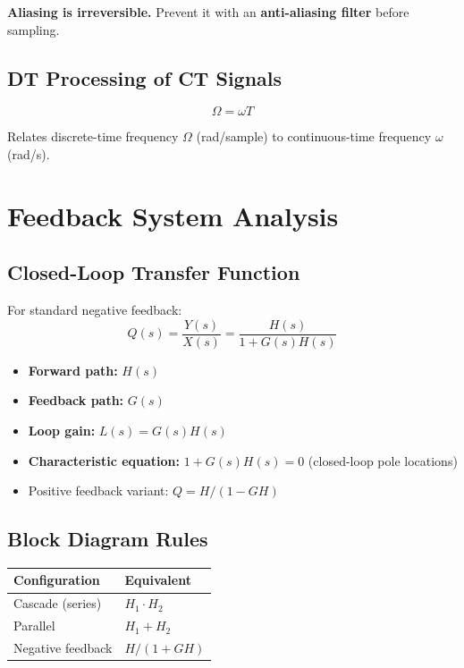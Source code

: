 \documentclass{article}
\begin{document}
\textbf{Aliasing is irreversible.} Prevent it with an \textbf{anti-aliasing filter} before sampling.

\subsection{DT Processing of CT Signals}

$$\Omega = \omega T$$

Relates discrete-time frequency $\Omega$ (rad/sample) to continuous-time frequency $\omega$ (rad/s).

\section{Feedback System Analysis}

\subsection{Closed-Loop Transfer Function}

For standard negative feedback:
$$Q(s) = \frac{Y(s)}{X(s)} = \frac{H(s)}{1 + G(s)H(s)}$$

\begin{itemize}
  \item \textbf{Forward path:} $H(s)$
  \item \textbf{Feedback path:} $G(s)$
  \item \textbf{Loop gain:} $L(s) = G(s)H(s)$
  \item \textbf{Characteristic equation:} $1 + G(s)H(s) = 0$ (closed-loop pole locations)
  \item Positive feedback variant: $Q = H/(1 - GH)$
\end{itemize}

\subsection{Block Diagram Rules}

\begin{center}
\begin{tabular}{ll}
\toprule
Configuration & Equivalent \\
\midrule
Cascade (series) & $H_1 \cdot H_2$ \\
Parallel & $H_1 + H_2$ \\
Negative feedback & $H/(1+GH)$ \\
\bottomrule
\end{tabular}
\end{center}
\end{document}

